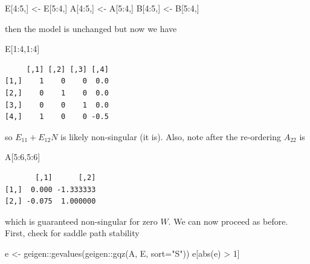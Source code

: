 \documentclass[
  letterpaper,
]{book}
\newenvironment{Shaded}{\begin{snugshade}}{\end{snugshade}}
\newcommand{\AttributeTok}[1]{\textcolor[rgb]{0.40,0.45,0.13}{#1}}
\newcommand{\DecValTok}[1]{\textcolor[rgb]{0.68,0.00,0.00}{#1}}
\newcommand{\FunctionTok}[1]{\textcolor[rgb]{0.28,0.35,0.67}{#1}}
\newcommand{\NormalTok}[1]{\textcolor[rgb]{0.00,0.23,0.31}{#1}}
\newcommand{\OtherTok}[1]{\textcolor[rgb]{0.00,0.23,0.31}{#1}}
\newcommand{\SpecialCharTok}[1]{\textcolor[rgb]{0.37,0.37,0.37}{#1}}
\newcommand{\StringTok}[1]{\textcolor[rgb]{0.13,0.47,0.30}{#1}}
\begin{document}
\begin{Shaded}
\begin{Highlighting}[]
\NormalTok{E[}\DecValTok{4}\SpecialCharTok{:}\DecValTok{5}\NormalTok{,] }\OtherTok{\textless{}{-}}\NormalTok{ E[}\DecValTok{5}\SpecialCharTok{:}\DecValTok{4}\NormalTok{,]}
\NormalTok{A[}\DecValTok{4}\SpecialCharTok{:}\DecValTok{5}\NormalTok{,] }\OtherTok{\textless{}{-}}\NormalTok{ A[}\DecValTok{5}\SpecialCharTok{:}\DecValTok{4}\NormalTok{,]}
\NormalTok{B[}\DecValTok{4}\SpecialCharTok{:}\DecValTok{5}\NormalTok{,] }\OtherTok{\textless{}{-}}\NormalTok{ B[}\DecValTok{5}\SpecialCharTok{:}\DecValTok{4}\NormalTok{,]}
\end{Highlighting}
\end{Shaded}

then the model is unchanged but now we have

\begin{Shaded}
\begin{Highlighting}[]
\NormalTok{E[}\DecValTok{1}\SpecialCharTok{:}\DecValTok{4}\NormalTok{,}\DecValTok{1}\SpecialCharTok{:}\DecValTok{4}\NormalTok{]}
\end{Highlighting}
\end{Shaded}

\begin{verbatim}
     [,1] [,2] [,3] [,4]
[1,]    1    0    0  0.0
[2,]    0    1    0  0.0
[3,]    0    0    1  0.0
[4,]    1    0    0 -0.5
\end{verbatim}

so \(E_{11} + E_{12}N\) is likely non-singular (it is). Also, note after
the re-ordering \(A_{22}\) is

\begin{Shaded}
\begin{Highlighting}[]
\NormalTok{A[}\DecValTok{5}\SpecialCharTok{:}\DecValTok{6}\NormalTok{,}\DecValTok{5}\SpecialCharTok{:}\DecValTok{6}\NormalTok{]}
\end{Highlighting}
\end{Shaded}

\begin{verbatim}
       [,1]      [,2]
[1,]  0.000 -1.333333
[2,] -0.075  1.000000
\end{verbatim}

which is guaranteed non-singular for zero \(W\). We can now proceed as
before. First, check for saddle path stability

\begin{Shaded}
\begin{Highlighting}[]
\NormalTok{e }\OtherTok{\textless{}{-}}\NormalTok{ geigen}\SpecialCharTok{::}\FunctionTok{gevalues}\NormalTok{(geigen}\SpecialCharTok{::}\FunctionTok{gqz}\NormalTok{(A, E, }\AttributeTok{sort=}\StringTok{"S"}\NormalTok{))}
\NormalTok{e[}\FunctionTok{abs}\NormalTok{(e) }\SpecialCharTok{\textgreater{}} \DecValTok{1}\NormalTok{]}
\end{Highlighting}
\end{Shaded}
\end{document}
